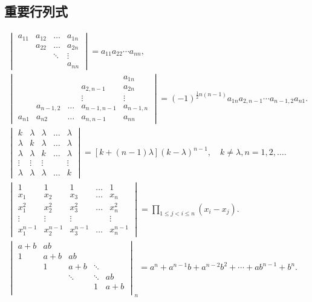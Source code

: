 \subsection*{重要行列式}
\begin{gather*}
	\begin{vmatrix}
		a_{11} & a_{12} & \dots & a_{1n} \\
		& a_{22} & \dots & a_{2n} \\
		& & \ddots & \vdots \\
		& & & a_{nn}
	\end{vmatrix}
	= a_{11} a_{22} \dotsm a_{nn}, \\%
	\begin{vmatrix}
		& & & & a_{1n} \\
		& & & a_{2,n-1} & a_{2n} \\
		& & & \vdots & \vdots \\
		& a_{n-1,2} & \dots & a_{n-1,n-1} & a_{n-1,n} \\
		a_{n1} & a_{n2} & \dots & a_{n,n-1} & a_{nn}
	\end{vmatrix}
	=(-1)^{\frac{1}{2}n(n-1)} a_{1n} a_{2,n-1} \dotsm a_{n-1,2} a_{n1}. \\
	\begin{vmatrix}
		k & \lambda & \lambda & \dots & \lambda \\
		\lambda & k & \lambda & \dots & \lambda \\
		\lambda & \lambda & k & \dots & \lambda \\
		\vdots & \vdots & \vdots & & \vdots \\
		\lambda & \lambda & \lambda & \dots & k
	\end{vmatrix}
	= [k+(n-1)\lambda] (k-\lambda)^{n-1},
	\quad k\neq\lambda,n=1,2,\dotsc. \\
	\begin{vmatrix}
		1 & 1 & 1 & \dots & 1 \\
		x_1 & x_2 & x_3 & \dots & x_n \\
		x_1^2 & x_2^2 & x_3^2 & \dots & x_n^2 \\
		\vdots & \vdots & \vdots& & \vdots \\
		x_1^{n-1} & x_2^{n-1} & x_3^{n-1} & \dots & x_n^{n-1}
	\end{vmatrix}
	= \prod_{1 \leq j < i \leq n}(x_i-x_j). \\
	\begin{vmatrix}
		a+b & ab & \\
		1 & a+b & ab & \\
		& 1 & a + b & \ddots & \\
		& & \ddots & \ddots & ab \\
		& & & 1 & a+b \\
	\end{vmatrix}_n
	= a^n + a^{n-1} b + a^{n-2} b^2 + \dotsb + a b^{n-1} + b^n.
\end{gather*}
